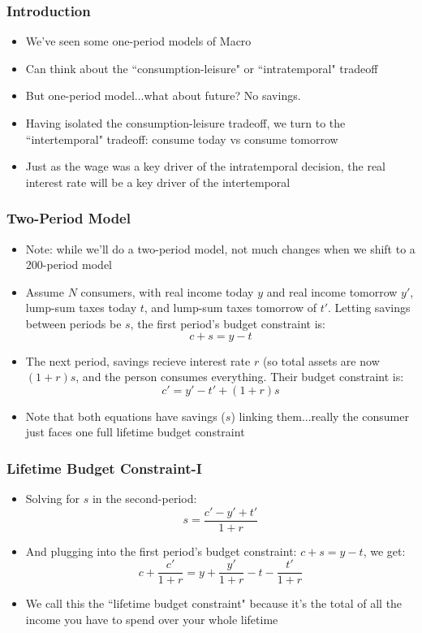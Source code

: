 \documentclass{beamer}
\author{Trevor S. Gallen}
\date{}
\begin{document}
\renewcommand*{\inserttotalframenumber}{\pageref{lastframe}}



\begin{frame}
\titlepage
\end{frame}

\begin{frame}
\frametitle[alignment=center]{Introduction}
\begin{itemize}
\item We've seen some one-period models of Macro
\bigskip
\item Can think about the ``consumption-leisure" or ``intratemporal" tradeoff
\bigskip
\item But one-period model...what about future?  No savings.
\bigskip
\item Having isolated the consumption-leisure tradeoff, we turn to the ``intertemporal" tradeoff:  consume today vs consume tomorrow
\bigskip
\item Just as the wage was a key driver of the intratemporal decision, the real interest rate will be a key driver of the intertemporal
\end{itemize}
\end{frame}

\begin{frame}
\frametitle[alignment=center]{Two-Period Model}
\begin{itemize}
\item Note: while we'll do a two-period model, not much changes when we shift to a 200-period model
\bigskip
\item Assume $N$ consumers, with real income today $y$ and real income tomorrow $y'$, lump-sum taxes today $t$, and lump-sum taxes tomorrow of $t'$.  Letting savings between periods be $s$, the first period's budget constraint is:
$$c+s=y-t$$
\item The next period, savings recieve interest rate $r$ (so total assets are now $(1+r)s$, and the person consumes everything.  Their budget constraint is:
$$c'=y'-t'+(1+r)s$$
\bigskip
\item Note that both equations have savings ($s$) linking them...really the consumer just faces one full lifetime budget constraint
\end{itemize}
\end{frame}

\begin{frame}
\frametitle[alignment=center]{Lifetime Budget Constraint-I}
\begin{itemize}
\item Solving for $s$ in the second-period:
$$s=\frac{c'-y'+t'}{1+r}$$
\item And plugging into the first period's budget constraint: $c+s=y-t$, we get:
$$c+\frac{c'}{1+r}=y+\frac{y'}{1+r}-t-\frac{t'}{1+r}$$
\item We call this the ``lifetime budget constraint" because it's the total of all the income you have to spend over your whole lifetime
\end{itemize}
\end{frame}
\end{document}
